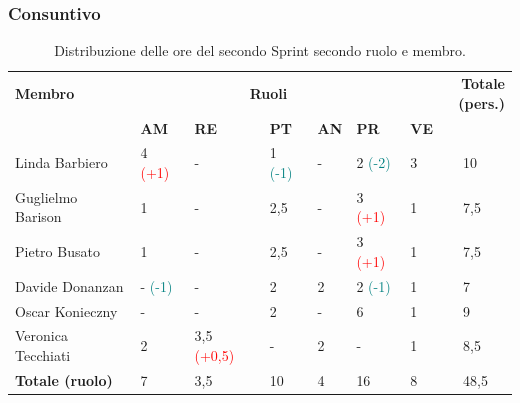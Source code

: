 \subsubsection{Consuntivo}
\begin{table}[ht!]
	\centering
	\begin{tabular}{p{3cm} p{1.4cm} p{1.6cm} p{1.5cm} p{1.5cm} p{1.5cm} p{1.5cm} p{1cm}}
		\toprule
        \textbf{Membro} & \multicolumn{5}{c}{\textbf{Ruoli}} & \multicolumn{2}{r}{\textbf{Totale (pers.)}}\\
		& \textbf{AM} & \textbf{RE} & \textbf{PT} & \textbf{AN} & \textbf{PR} & \textbf{VE}\\
		\midrule
        Linda Barbiero          & 4 \textcolor{red}{(+1)} & - & 1 \textcolor{teal}{(-1)}  & - & 2
        \textcolor{teal}{(-2)} & 3 & 10 \\
        Guglielmo Barison       & 1 & - & 2,5 & -     & 3 \textcolor{red}{(+1)}  & 1     & 7,5\\
        Pietro Busato           & 1     & -     & 2,5     & -     & 3 \textcolor{red}{(+1)}  & 1     & 7,5 \\
        Davide Donanzan         & - \textcolor{teal}{(-1)}    & -     & 2     & 2     & 2
        \textcolor{teal}{(-1)}     & 1     & 7 \\
        Oscar Konieczny         & -   & -     & 2     & -     & 6     & 1     & 9 \\
        Veronica Tecchiati      & 2   & 3,5 \textcolor{red}{(+0,5)}     & -     & 2     & -     & 1     & 8,5 \\
        \bottomrule
        \textbf{Totale (ruolo)} & 7    & 3,5     & 10     & 4   & 16     & 8   & 48,5 \\
	\end{tabular}
	\caption{Distribuzione delle ore del secondo Sprint secondo ruolo e membro.}
	\label{table:Distribuzione delle ore consuntive del secondo Sprint secondo ruolo e membro}
\end{table}
